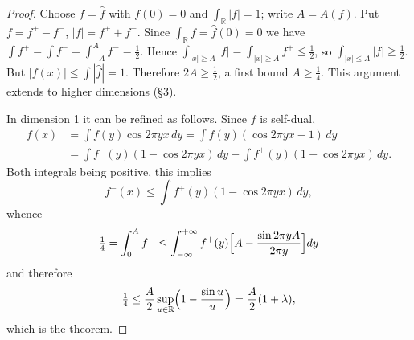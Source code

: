 \documentclass[11pt,reqno]{amsart}
\theoremstyle{plain}
\theoremstyle{definition}
\theoremstyle{remark}
\newcommand{\R}{\mathbb{R}}
\newcommand{\fh}{\widehat{f}}
\begin{document}
\begin{proof}
Choose $f=\fh$ with $f(0)=0$ and $\int_\R|f|=1$; write $A=A(f)$. Put $f=f^+-f^-$,
$|f|=f^++f^-$. Since $\int_\R f=\fh(0)=0$ we have
$\int f^+=\int f^-=\int_{-A}^{A}f^-=\tfrac12$. Hence
$\int_{|x|\ge A}|f|=\int_{|x|\ge A}f^+\le\tfrac12$, so
$\int_{|x|\le A}|f|\ge\tfrac12$. But $|f(x)|\le\int|\fh|=1$. Therefore
$2A\ge\tfrac12$, a first bound $A\ge\tfrac14$. This argument extends to higher
dimensions (\S3).

In dimension 1 it can be refined as follows. Since $f$ is self-dual,
\[
\begin{aligned}
 f(x)&=\int f(y)\cos2\pi yx\,dy=\int f(y)(\cos2\pi yx-1)\,dy\\
     &=\int f^-(y)(1-\cos2\pi yx)\,dy-\int f^+(y)(1-\cos2\pi yx)\,dy .
\end{aligned}
\]
Both integrals being positive, this implies
\[f^-(x)\le\int f^+(y)(1-\cos2\pi yx)\,dy,\]
whence
\[\tfrac14=\int_0^Af^-\le\int_{-\infty}^{+\infty}f^+(y)\Bigl[A-\frac{\sin2\pi yA}{2\pi y}\Bigr]dy\]
and therefore
\[\tfrac14\le\frac A2\sup_{u\in\R}\Bigl(1-\frac{\sin u}{u}\Bigr)=\frac A2(1+\lambda),\]
which is the theorem.
\end{proof}
\end{document}
